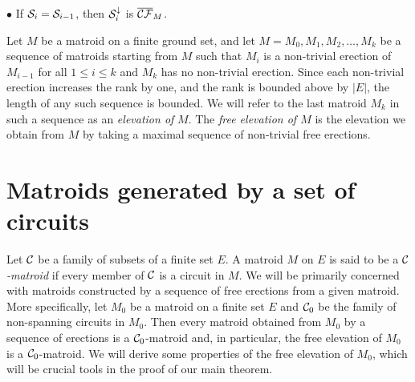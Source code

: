 \documentclass{daj}
\begin{document}
$\bullet$ If ${\cal S}_i={\cal S}_{i-1}$, then ${\cal S}_i^{\downarrow}$ is $\overline{{\cal CF}}_M$.

\medskip


Let $M$ be a matroid on a finite ground set,
and let $M=M_0, M_1, M_2, \dots, M_k$ be a
sequence of matroids starting from $M$ such that
$M_i$ is a non-trivial %
erection of $M_{i-1}$ for all $1\leq i\leq k$ and $M_k$ has no non-trivial erection.
Since each non-trivial  erection increases the rank by one, and the rank is bounded above by $|E|$,
the length of any such sequence is bounded.
We will refer to the last matroid $M_k$ in such a sequence as an {\em elevation of} $M$.
The {\em free elevation of $M$} is the elevation we obtain from $M$ by taking a maximal sequence of non-trivial free erections.

\section{Matroids generated by a set of circuits}\label{sec:c-matroid}
Let ${\cal C}$ be a family of subsets of a finite set $E$.
A matroid $M$ on $E$ is said to be a  {\em ${\cal C}$-matroid} if every member of ${\cal C}$ is a circuit in $M$.
We will be primarily concerned with matroids constructed by a sequence of free erections from a given matroid.
 More specifically, let $M_0$ be a matroid on a finite set $E$ and ${\cal C}_0$ be the family of non-spanning circuits in $M_0$. Then every  matroid obtained from $M_0$ by a sequence of erections is a ${\cal C}_0$-matroid and, in particular, the free elevation of $M_0$ is a ${\cal C}_0$-matroid.
We will derive some properties of the free elevation of $M_0$, which will be crucial tools in the proof of our main theorem.
\end{document}

